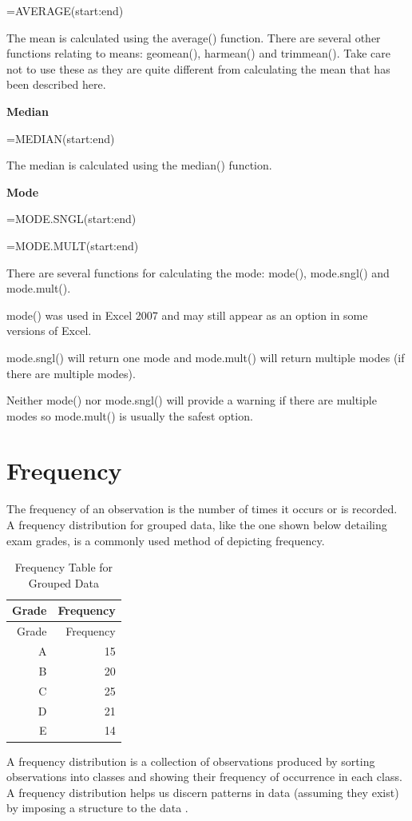 \documentclass[
]{book}
\begin{document}
=AVERAGE(start:end)

The mean is calculated using the average() function. There are several other functions relating to means: geomean(), harmean() and trimmean(). Take care not to use these as they are quite different from calculating the mean that has been described here.

\textbf{Median}

=MEDIAN(start:end)

The median is calculated using the median() function.

\textbf{Mode}

=MODE.SNGL(start:end)

=MODE.MULT(start:end)

There are several functions for calculating the mode: mode(), mode.sngl() and mode.mult().

mode() was used in Excel 2007 and may still appear as an option in some versions of Excel.

mode.sngl() will return one mode and mode.mult() will return multiple modes (if there are multiple modes).

Neither mode() nor mode.sngl() will provide a warning if there are multiple modes so mode.mult() is usually the safest option.

\hypertarget{frequency}{%
\section{Frequency}\label{frequency}}

The frequency of an observation is the number of times it occurs or is recorded. A frequency distribution for grouped data, like the one shown below detailing exam grades, is a commonly used method of depicting frequency.

\begin{longtable}[]{@{}rr@{}}
\caption{\label{tab:table5}Frequency Table for Grouped Data}\tabularnewline
\toprule
Grade & Frequency \\
\midrule
\endfirsthead
\toprule
Grade & Frequency \\
\midrule
\endhead
A & 15 \\
B & 20 \\
C & 25 \\
D & 21 \\
E & 14 \\
\bottomrule
\end{longtable}

A frequency distribution is a collection of observations produced by sorting observations into classes and showing their frequency of occurrence in each class. A frequency distribution helps us discern patterns in data (assuming they exist) by imposing a structure to the data \citep{Witte2017}.
\end{document}
